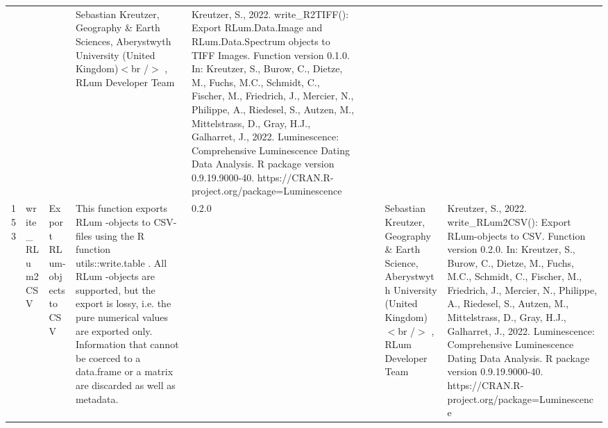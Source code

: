 \begin{table}[ht]
\begin{tabular}{rllllllll}
 &  &  & Sebastian Kreutzer, Geography \& Earth Sciences, Aberystwyth University (United Kingdom)$<$br /$>$ , RLum Developer Team & Kreutzer, S., 2022. write\_R2TIFF(): Export RLum.Data.Image and RLum.Data.Spectrum objects to TIFF Images. Function version 0.1.0. In: Kreutzer, S., Burow, C., Dietze, M., Fuchs, M.C., Schmidt, C., Fischer, M., Friedrich, J., Mercier, N., Philippe, A., Riedesel, S., Autzen, M., Mittelstrass, D., Gray, H.J., Galharret, J., 2022. Luminescence: Comprehensive Luminescence Dating Data Analysis. R package version 0.9.19.9000-40. https://CRAN.R-project.org/package=Luminescence
 \\ 
  153 & write\_RLum2CSV & Export RLum-objects to CSV & This function exports  RLum -objects to CSV-files using the R function utils::write.table . All  RLum -objects are supported, but the export is lossy, i.e. the pure numerical values are exported only. Information that cannot be coerced to a  data.frame  or a  matrix  are discarded as well as metadata. & 0.2.0
 &  &  & Sebastian Kreutzer, Geography \& Earth Science, Aberystwyth University (United Kingdom)$<$br /$>$ , RLum Developer Team & Kreutzer, S., 2022. write\_RLum2CSV(): Export RLum-objects to CSV. Function version 0.2.0. In: Kreutzer, S., Burow, C., Dietze, M., Fuchs, M.C., Schmidt, C., Fischer, M., Friedrich, J., Mercier, N., Philippe, A., Riedesel, S., Autzen, M., Mittelstrass, D., Gray, H.J., Galharret, J., 2022. Luminescence: Comprehensive Luminescence Dating Data Analysis. R package version 0.9.19.9000-40. https://CRAN.R-project.org/package=Luminescence
 \\ 
   \hline
\end{tabular}
\end{table}

